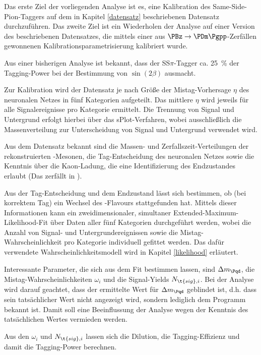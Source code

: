 Das erste Ziel der vorliegenden Analyse ist es, eine Kalibration des Same-Side-Pion-Taggers auf dem in Kapitel \ref{datensatz} beschriebenen Datensatz durchzuführen.
Das zweite Ziel ist ein Wiederholen der Analyse auf einer Version des beschriebenen Datensatzes, die mittels einer aus $\PBz \to \PDm\Pgpp$-Zerfällen gewonnenen Kalibrationsparametrisierung kalibriert wurde.

Aus einer bisherigen Analyse ist bekannt, dass der SS$π$-Tagger ca. \SI{25}{\percent} der Tagging-Power bei der Bestimmung von $\sin(2β)$ ausmacht.

Zur Kalibration wird der Datensatz je nach Größe der Mistag-Vorhersage $η$ des neuronalen Netzes in fünf Kategorien aufgeteilt.
Das mittlere $η$ wird jeweils für alle Signalereignisse pro Kategorie ermittelt.
Die Trennung von Signal und Untergrund erfolgt hierbei über das sPlot-Verfahren\cite{splot}, wobei ausschließlich die Massenverteilung zur Unterscheidung von Signal und Untergrund verwendet wird.

Aus dem Datensatz bekannt sind die Massen- und Zerfallszeit-Verteilungen der rekonstruierten \PB-Mesonen, die Tag-Entscheidung des neuronalen Netzes sowie die Kenntnis über die Kaon-Ladung, die eine Identifizierung des Endzustandes erlaubt (Das \PKst zerfällt in \PKp\Pgpm).

Aus der Tag-Entscheidung und dem Endzustand lässt sich bestimmen, ob (bei korrektem Tag) ein Wechsel des \Pqb-Flavours stattgefunden hat.
Mittels dieser Informationen kann ein zweidimensionaler, simultaner Extended-Maximum-Likelihood-Fit über Daten aller fünf Kategorien durchgeführt werden, wobei die Anzahl von Signal- und Untergrundereignissen sowie die Mistag-Wahrscheinlichkeit pro Kategorie individuell gefittet werden.
Das dafür verwendete Wahrscheinlichkeitsmodell wird in Kapitel \ref{likelihood} erläutert.

Interessante Parameter, die sich aus dem Fit bestimmen lassen, sind $\difference{m_{\Pqd}}$, die Mistag-Wahrscheinlichkeiten $ω_i$ und die Signal-Yields $N_{\t{sig},i}$.
Bei der Analyse wird darauf geachtet, dass der ermittelte Wert für $\difference{m_{\Pqd}}$ geblindet ist, d.h. dass sein tatsächlicher Wert nicht angezeigt wird, sondern lediglich dem Programm bekannt ist.
Damit soll eine Beeinflussung der Analyse wegen der Kenntnis des tatsächlichen Wertes vermieden werden.

Aus den $ω_i$ und $N_{\t{sig},i}$ lassen sich die Dilution, die Tagging-Effizienz und damit die Tagging-Power berechnen.

